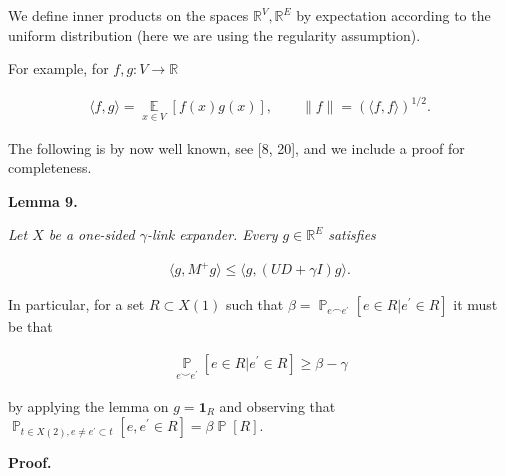 \documentclass[10pt,a4paper]{article}
\begin{document}
We define inner products on the spaces $\mathbb{R}^{V},\mathbb{R}^{E}$ by expectation according to the uniform distribution (here we are using the regularity assumption).\par




For example, for $f,g:V\to\mathbb{R}$\par


\[\begin{gathered}
\langle f,g\rangle=\operatorname*{\mathbb{E}}_{x\in V}[f(x)g(x)],\qquad\lVert f\rVert=(\langle f,f\rangle)^{1/2}.
\end{gathered}\]


The following is by now well known, see [8, 20], and we include a proof for completeness.\par





\par\medskip\noindent\textbf{
\textbf{Lemma 9}\textbf{.}
}\par



\emph{Let $X$ be a one-sided $\gamma$-link expander. Every $g\in\mathbb{R}^{E}$ satisfies}\par


\[\begin{gathered}
\langle g,M^{+}g\rangle\leq\langle g,(UD+\gamma I)g\rangle.
\end{gathered}\]






In particular, for a set $R\subset X(1)$ such that $\beta=\operatorname*{\mathbb{P}}_{e\smallfrown e^{\prime}}[e\in R|e^{\prime}\in R]$ it must be that\par


\[\begin{gathered}
\operatorname*{\mathbb{P}}_{e\smallsmile e^{\prime}}[e\in R|e^{\prime}\in R]\geq\beta-\gamma
\end{gathered}\]


by applying the lemma on $g={\mathbf{1}}_{R}$ and observing that $\operatorname*{\mathbb{P}}_{t\in X(2),e\neq e^{\prime}\subset t}[e,e^{\prime}\in R]=\beta\operatorname*{\mathbb{P}}[R]$.\par




\par\medskip\noindent\textbf{Proof.}\par
\end{document}
